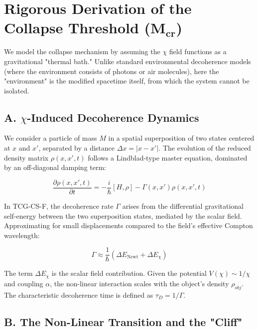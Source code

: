 \documentclass[11pt, a4paper]{article}
\begin{document}
\section{Rigorous Derivation of the Collapse Threshold (\texorpdfstring{$\mathbf{M_{cr}}$}{M_cr})} 

We model the collapse mechanism by assuming the $\chi$ field functions as a gravitational "thermal bath." Unlike standard environmental decoherence models (where the environment consists of photons or air molecules), here the "environment" is the modified spacetime itself, from which the system cannot be isolated.

\subsection{\texorpdfstring{A. $\chi$-Induced Decoherence Dynamics}{A. chi-Induced Decoherence Dynamics}} 

We consider a particle of mass $M$ in a spatial superposition of two states centered at $x$ and $x'$, separated by a distance $\Delta x = |x - x'|$. The evolution of the reduced density matrix $\rho(x, x', t)$ follows a Lindblad-type master equation, dominated by an off-diagonal damping term:

\begin{equation}
    \frac{\partial \rho(x, x', t)}{\partial t} = -\frac{i}{\hbar} [H, \rho] - \Gamma(x, x') \rho(x, x', t)
\end{equation}

In TCG-CS-F, the decoherence rate $\Gamma$ arises from the differential gravitational self-energy between the two superposition states, mediated by the scalar field. Approximating for small displacements compared to the field's effective Compton wavelength:

\begin{equation}
    \Gamma \approx \frac{1}{\hbar} \left( \Delta E_{\text{Newt}} + \Delta E_{\chi} \right)
\end{equation}

The term $\Delta E_{\chi}$ is the scalar field contribution. Given the potential $V(\chi) \sim 1/\chi$ and coupling $\alpha$, the non-linear interaction scales with the object's density $\rho_{obj}$. The characteristic decoherence time is defined as $\tau_{D} = 1/\Gamma$.

\subsection{\texorpdfstring{B. The Non-Linear Transition and the "Cliff"}{B. The Non-Linear Transition and the Cliff}} 
\end{document}
